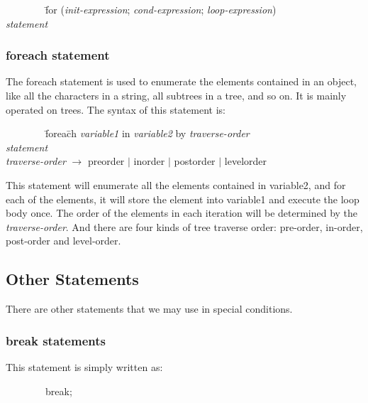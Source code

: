 \documentclass[12pt,psfig,a4]{article}
\begin{document}
\begin{code}
\begin{tabbing}
~~~~~~~~\= for (\= \textsl{init-expression}; \textsl{cond-expression}; \textsl{loop-expression}) \\
\> \> \textsl{statement}
\end{tabbing}
\end{code}

\subsubsection{foreach statement}
The foreach statement is used to enumerate the elements contained in an object, like all the characters in a string, all subtrees in a tree, and so on. It is mainly operated on trees. The syntax of this statement is:

\begin{code}
\begin{tabbing}
~~~~~~~~\= forea\= ch \textsl{variable1} in \textsl{variable2} by \textsl{traverse-order} \\
\> \> \textsl{statement} \\
\> \textsl{traverse-order} $\rightarrow$ preorder $\mid$ inorder $\mid$ postorder $\mid$ levelorder
\end{tabbing}
\end{code}

This statement will enumerate all the elements contained in variable2, and for each of the elements, it will store the element into variable1 and execute the loop body once. The order of the elements in each iteration will be determined by the \textsl{traverse-order}. And there are four kinds of tree traverse order: pre-order, in-order, post-order and level-order.

\subsection{Other Statements}
There are other statements that we may use in special conditions.

\subsubsection{break statements}
This statement is simply written as:

\begin{code}
\begin{tabbing}
~~~~~~~~break;
\end{tabbing}
\end{code}
\end{document}
